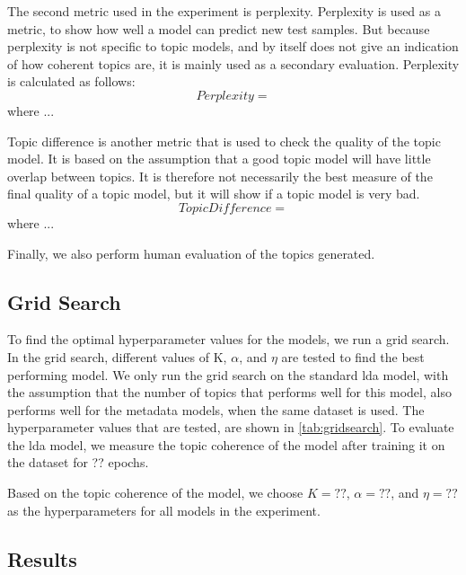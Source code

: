 The second metric used in the experiment is perplexity.
Perplexity is used as a metric, to show how well a model can predict new test samples.
But because perplexity is not specific to topic models, and by itself does not give an indication of how coherent topics are, it is mainly used as a secondary evaluation.
Perplexity is calculated as follows:
\begin{equation}
	Perplexity = 
\end{equation}
\noindent where ...

Topic difference is another metric that is used to check the quality of the topic model.
It is based on the assumption that a good topic model will have little overlap between topics.
It is therefore not necessarily the best measure of the final quality of a topic model, but it will show if a topic model is very bad.
\begin{equation}
	TopicDifference = 
\end{equation}
\noindent where ...

Finally, we also perform human evaluation of the topics generated.

\subsection{Grid Search}\label{sec:experiment_gridsearch}
To find the optimal hyperparameter values for the models, we run a grid search.
In the grid search, different values of K, $\alpha$, and $\eta$ are tested to find the best performing model.
We only run the grid search on the standard \gls{lda} model, with the assumption that the number of topics that performs well for this model, also performs well for the metadata models, when the same dataset is used.
The hyperparameter values that are tested, are shown in \autoref{tab:gridsearch}.
To evaluate the \gls{lda} model, we measure the topic coherence of the model after training it on the dataset for ?? epochs.

Based on the topic coherence of the model, we choose $K = ??$, $\alpha = ??$, and $\eta = ??$ as the hyperparameters for all models in the experiment.



\subsection{Results}\label{sec:results}


